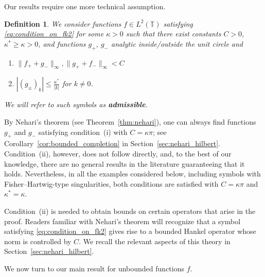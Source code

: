 \documentclass[11pt]{amsart}
\theoremstyle{plain}
\newtheorem{definition}[theorem]{Definition}
\theoremstyle{remark}
\numberwithin{equation}{section}
\begin{document}
Our results require one more technical assumption. 
\begin{definition}\label{def:nehari_complete}
We consider functions $f\in L^2(\mathbb{T})$ satisfying \eqref{eq:condition_on_fk2} for some $\kappa>0$ such that there exist constants $C>0$, $\kappa^*\geq \kappa>0$, and functions $g_+$, $g_-$ analytic inside/outside the unit circle and
\begin{enumerate} 
\item[i)] \label{cond:boundedness}
$\|f_++g_-\|_{\infty}, \|g_++f_-\|_{\infty}< C$
\item[ii)] \label{cond:fourier}
$|(g_{\pm})_k|\leq \frac{\kappa^*}{|k|}$ for $k\not=0$.
\end{enumerate}
We will refer to such symbols as \textbf{admissible}. 
\end{definition}

By Nehari's theorem (see Theorem~\ref{thm:nehari}), one can always find
functions \(g_+\) and \(g_-\) satisfying condition~(i) with
\(C=\kappa\pi\); see Corollary~\ref{cor:bounded_completion} in
Section~\ref{sec:nehari_hilbert}. Condition~(ii), however, does not follow
directly, and, to the best of our knowledge, there are no general results in
the literature guaranteeing that it holds. Nevertheless, in all the examples
considered below, including symbols with Fisher--Hartwig-type singularities,
both conditions are satisfied with \(C=\kappa\pi\) and
\(\kappa^*=\kappa\).

Condition~(ii) is needed to obtain bounds on certain operators that arise in
the proof. Readers familiar with Nehari's theorem will recognize that a symbol
satisfying \eqref{eq:condition_on_fk2}  gives rise to a bounded Hankel
operator whose norm is controlled by \(C\). We recall the relevant aspects of
this theory in Section~\ref{sec:nehari_hilbert}.

We now turn to our main result for unbounded functions \(f\).
\end{document}
